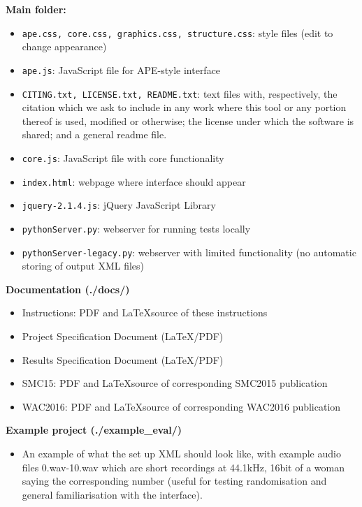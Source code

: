 \documentclass[11pt, oneside]{article}   	%
\begin{document}
		\textbf{Main folder:} 
			\begin{itemize}
	            	\item \texttt{ape.css, core.css, graphics.css, structure.css}: style files (edit to change appearance)
	            	\item \texttt{ape.js}: JavaScript file for APE-style interface \cite{ape}
	            	\item \texttt{CITING.txt, LICENSE.txt, README.txt}: text files with, respectively, the citation which we ask to include in any work where this tool or any portion thereof is used, modified or otherwise; the license under which the software is shared; and a general readme file.
	            	\item \texttt{core.js}: JavaScript file with core functionality
	            	\item \texttt{index.html}: webpage where interface should appear
	            	\item \texttt{jquery-2.1.4.js}: jQuery JavaScript Library
	            	\item \texttt{pythonServer.py}: webserver for running tests locally
	            	\item \texttt{pythonServer-legacy.py}: webserver with limited functionality (no automatic storing of output XML files)\\
			\end{itemize}
	     \textbf{Documentation (./docs/)}
	         \begin{itemize}
	         		\item Instructions: PDF and \LaTeX source of these instructions
	            	\item Project Specification Document (\LaTeX/PDF)
	            	\item Results Specification Document (\LaTeX/PDF)
	            	\item SMC15: PDF and \LaTeX source of corresponding SMC2015 publication \cite{waet}
	            	\item WAC2016: PDF and \LaTeX source of corresponding WAC2016 publication\\
			\end{itemize}
         \textbf{Example project (./example\_eval/)}
            	\begin{itemize}
            		\item An example of what the set up XML should look like, with example audio files 0.wav-10.wav which are short recordings at 44.1kHz, 16bit of a woman saying the corresponding number (useful for testing randomisation and general familiarisation with the interface).\\ 
            	\end{itemize}
\end{document}
